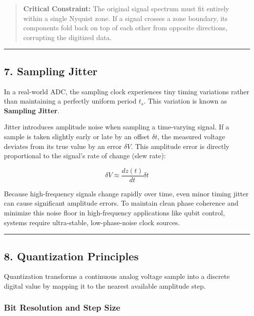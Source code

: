 \documentclass[
]{article}
\begin{document}
\begin{quote}
\textbf{Critical Constraint:} The original signal spectrum must fit
entirely within a single Nyquist zone. If a signal crosses a zone
boundary, its components fold back on top of each other from opposite
directions, corrupting the digitized data.
\end{quote}

\begin{center}\rule{0.5\linewidth}{0.5pt}\end{center}

\subsection{7. Sampling Jitter}\label{sampling-jitter}

In a real-world ADC, the sampling clock experiences tiny timing
variations rather than maintaining a perfectly uniform period \(t_s\).
This variation is known as \textbf{Sampling Jitter}.

Jitter introduces amplitude noise when sampling a time-varying signal.
If a sample is taken slightly early or late by an offset \(\delta t\),
the measured voltage deviates from its true value by an error
\(\delta V\). This amplitude error is directly proportional to the
signal's rate of change (slew rate):

\[\delta V \approx \frac{dz(t)}{dt} \delta t\]

Because high-frequency signals change rapidly over time, even minor
timing jitter can cause significant amplitude errors. To maintain clean
phase coherence and minimize this noise floor in high-frequency
applications like qubit control, systems require ultra-stable,
low-phase-noise clock sources.

\begin{center}\rule{0.5\linewidth}{0.5pt}\end{center}

\subsection{8. Quantization Principles}\label{quantization-principles}

Quantization transforms a continuous analog voltage sample into a
discrete digital value by mapping it to the nearest available amplitude
step.

\subsubsection{Bit Resolution and Step
Size}\label{bit-resolution-and-step-size}
\end{document}

